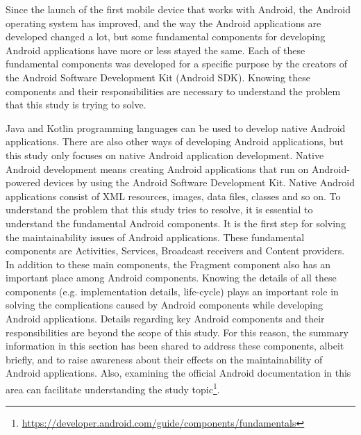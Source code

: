 Since the launch of the first mobile device that works with Android,  the Android operating system has improved, and the way the Android applications are developed changed a lot, but some fundamental components for developing Android applications have more or less stayed the same. Each of these fundamental components was developed for a specific purpose by the creators of the Android Software Development Kit (Android SDK). Knowing these components and their responsibilities are necessary to understand the problem that this study is trying to solve.

Java and Kotlin programming languages can be used to develop native Android applications. There are also other ways of developing Android applications, but this study only focuses on native Android application development. Native Android development means creating Android applications that run on Android-powered devices by using the Android Software Development Kit. Native Android applications consist of  XML resources, images, data files, classes and so on. To understand the problem that this study tries to resolve, it is essential to understand the fundamental Android components. It is the first step for solving the maintainability issues of Android applications. These fundamental components are Activities, Services, Broadcast receivers and Content providers. In addition to these main components, the Fragment component also has an important place among Android components. Knowing the details of all these components (e.g. implementation details, life-cycle) plays an important role in solving the complications caused by Android components while developing Android applications. Details regarding key Android components and their responsibilities are beyond the scope of this study. For this reason, the summary information in this section has been shared to address these components, albeit briefly, and to raise awareness about their effects on the maintainability of Android applications. Also, examining the official Android documentation in this area can facilitate understanding the study topic\footnote{\url{https://developer.android.com/guide/components/fundamentals}}.